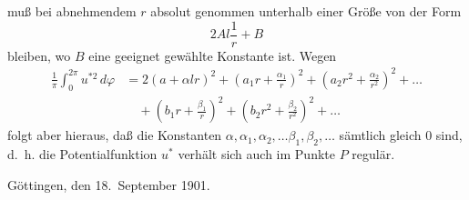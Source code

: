 \documentclass{article}
\begin{document}
muß bei abnehmendem $r$ absolut genommen unterhalb einer Größe von der Form
\[
2 A l \frac{1}{r} + B
\]
bleiben, wo $B$ eine geeignet gewählte Konstante ist. Wegen
\[
\begin{aligned}
\frac{1}{\pi} \int_0^{2\pi} u^{*2}\,d\varphi &= 2(a + \alpha l r)^2 + \left(a_1 r + \frac{\alpha_1}{r}\right)^2 + \left(a_2 r^2 + \frac{\alpha_2}{r^2}\right)^2 + \dots \\
&\quad + \left(b_1 r + \frac{\beta_1}{r}\right)^2 + \left(b_2 r^2 + \frac{\beta_2}{r^2}\right)^2 + \dots
\end{aligned}
\]
folgt aber hieraus, daß die Konstanten $\alpha, \alpha_1, \alpha_2, \dots \beta_1, \beta_2, \dots$ sämtlich gleich 0 sind, d.~h. die Potentialfunktion $u^*$ verhält sich auch im Punkte $P$ regulär.

Göttingen, den 18.~September 1901.
\end{document}
